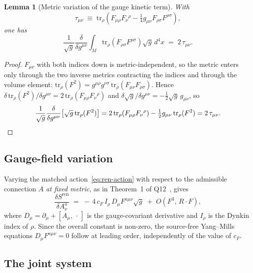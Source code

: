\documentclass[12pt,a4paper]{article}
\newtheorem{lemma}[theorem]{Lemma}
\theoremstyle{remark}
\begin{document}
      \begin{lemma}[Metric variation of the gauge kinetic term]
        \label{lem:YM-stress}
        With
        \[
          \tau_{\mu\nu}
          \;\equiv\; \mathrm{tr}_\rho\!\left(F_{\mu\rho}F_\nu{}^\rho
            - \tfrac14 g_{\mu\nu}F_{\rho\sigma}F^{\rho\sigma}\right),
        \]
        one has
        \[
          \frac{1}{\sqrt{g}}\frac{\delta}{\delta g^{\mu\nu}}
          \int_M \mathrm{tr}_\rho(F_{\rho\sigma}F^{\rho\sigma})\sqrt{g}\,d^4x
          \;=\;
          2\,\tau_{\mu\nu}.
        \]
      \end{lemma}

      \begin{proof}
        $F_{\mu\nu}$ with both indices down is metric-independent, so the metric enters only
        through the two inverse metrics contracting the indices and through the volume element:
        $\mathrm{tr}_\rho(F^2) = g^{\mu\rho}g^{\nu\sigma}\,\mathrm{tr}_\rho(F_{\mu\nu}F_{\rho\sigma})$.
        Hence
        $\delta\,\mathrm{tr}_\rho(F^2)/\delta g^{\mu\nu} = 2\,\mathrm{tr}_\rho(F_{\mu\rho}F_\nu{}^\rho)$
        and $\delta\sqrt{g}/\delta g^{\mu\nu} = -\tfrac12\sqrt{g}\,g_{\mu\nu}$, so
        \[
          \frac{1}{\sqrt{g}}\frac{\delta}{\delta g^{\mu\nu}}
          \bigl[\sqrt{g}\,\mathrm{tr}_\rho(F^2)\bigr]
          = 2\,\mathrm{tr}_\rho(F_{\mu\rho}F_\nu{}^\rho)
            - \tfrac12 g_{\mu\nu}\,\mathrm{tr}_\rho(F^2)
          = 2\,\tau_{\mu\nu}. \qedhere
        \]
      \end{proof}

    \subsection{Gauge-field variation}
      \label{ssec:gauge-var}

      Varying the matched action~\eqref{eq:ren-action} with respect to the admissible connection
      $A$ \emph{at fixed metric}, as in Theorem~1 of Q12~\cite{Beau2026q12}, gives
      \[
        \frac{\delta S^{\mathrm{ren}}}{\delta A^a_\nu}
        \;=\;
        -\,4\,c_F\,I_\rho\,D_\mu F^{a\mu\nu}\sqrt{g}
        \;+\;
        O(F^3,\,R\cdot F),
      \]
      where $D_\mu = \partial_\mu + [A_\mu,\,\cdot\,]$ is the gauge-covariant derivative and
      $I_\rho$ is the Dynkin index of $\rho$.
      Since the overall constant is non-zero, the source-free Yang--Mills equations
      $D_\mu F^{a\mu\nu} = 0$ follow at leading order, independently of the value of $c_F$.

    \subsection{The joint system}
      \label{ssec:joint}
\end{document}
